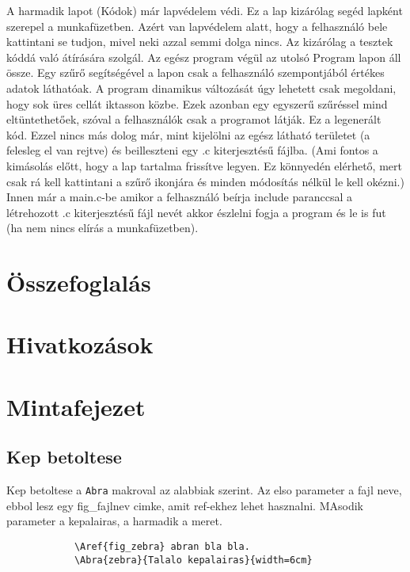 \documentclass[12ppt,a4paper,oneside]{report}
\begin{document}
    {A harmadik lapot (Kódok) már lapvédelem védi. Ez a lap kizárólag segéd lapként szerepel a munkafüzetben. Azért van lapvédelem alatt, hogy a felhasználó bele kattintani se tudjon, mivel neki azzal semmi dolga nincs. Az kizárólag a tesztek kóddá való átírására szolgál. Az egész program végül az utolsó Program lapon áll össze. Egy szűrő segítségével a lapon csak a felhasználó szempontjából értékes adatok láthatóak. A program dinamikus változását úgy lehetett csak megoldani, hogy sok üres cellát iktasson közbe. Ezek azonban egy egyszerű szűréssel mind eltüntethetőek, szóval a felhasználók csak a programot látják. Ez a legenerált kód. Ezzel nincs más dolog már, mint kijelölni az egész látható területet (a felesleg el van rejtve) és beilleszteni egy .c kiterjesztésű fájlba. (Ami fontos a kimásolás előtt, hogy a lap tartalma frissítve legyen. Ez könnyedén elérhető, mert csak rá kell kattintani a szűrő ikonjára és minden módosítás nélkül le kell okézni.) Innen már a main.c-be amikor a felhasználó beírja include paranccsal a létrehozott .c kiterjesztésű fájl nevét akkor észlelni fogja a program és le is fut (ha nem nincs elírás a munkafüzetben).}

\chapter{Összefoglalás} %

\chapter*{Hivatkozások}

\appendix

\chapter{Mintafejezet}
    \section{Kep betoltese}
        Kep betoltese a \texttt{Abra} makroval az alabbiak szerint. Az elso parameter a fajl neve, ebbol lesz egy fig\_fajlnev cimke, amit ref-ekhez lehet hasznalni. MAsodik parameter a kepalairas, a harmadik a meret.
        \begin{verbatim}
            \Aref{fig_zebra} abran bla bla.
            \Abra{zebra}{Talalo kepalairas}{width=6cm}
        \end{verbatim}
\end{document}
